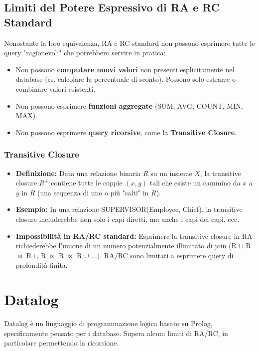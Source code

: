 \documentclass{article}
\newcommand{\naturaljoin}{\Join}
\begin{document}
	\subsection{Limiti del Potere Espressivo di RA e RC Standard}
	Nonostante la loro equivalenza, RA e RC standard non possono esprimere tutte le query "ragionevoli" che potrebbero servire in pratica:
	\begin{itemize}
		\item Non possono \textbf{computare nuovi valori} non presenti esplicitamente nel database (es. calcolare la percentuale di sconto). Possono solo estrarre o combinare valori esistenti.
		\item Non possono esprimere \textbf{funzioni aggregate} (SUM, AVG, COUNT, MIN, MAX).
		\item Non possono esprimere \textbf{query ricorsive}, come la \textbf{Transitive Closure}.
	\end{itemize}
	
	\subsubsection{Transitive Closure}
	\begin{itemize}
		\item \textbf{Definizione:} Data una relazione binaria $R$ su un insieme $X$, la transitive closure $R^+$ contiene tutte le coppie $(x, y)$ tali che esiste un cammino da $x$ a $y$ in $R$ (una sequenza di uno o più "salti" in $R$).
		\item \textbf{Esempio:} In una relazione SUPERVISOR(Employee, Chief), la transitive closure includerebbe non solo i capi diretti, ma anche i capi dei capi, ecc.
		\item \textbf{Impossibilità in RA/RC standard:} Esprimere la transitive closure in RA richiederebbe l'unione di un numero potenzialmente illimitato di join (R $\cup$ R $\naturaljoin$ R $\cup$ R $\naturaljoin$ R $\naturaljoin$ R $\cup$ ...). RA/RC sono limitati a esprimere query di profondità finita.
	\end{itemize}
	
	\section{Datalog}
	Datalog è un linguaggio di programmazione logica basato su Prolog, specificamente pensato per i database. Supera alcuni limiti di RA/RC, in particolare permettendo la ricorsione.
	
\end{document}

